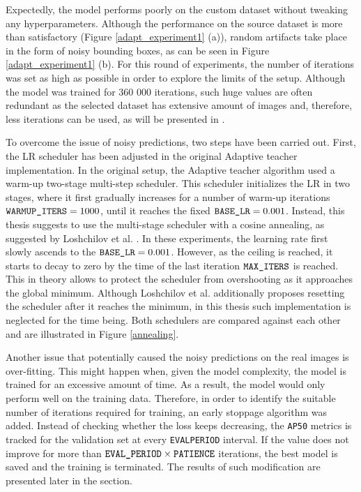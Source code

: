 Expectedly, the model performs poorly on the custom dataset without tweaking any hyperparameters. Although the performance on the source dataset is more than satisfactory (Figure \ref{adapt_experiment1} (a)), random artifacts take place in the form of noisy bounding boxes, as can be seen in Figure \ref{adapt_experiment1} (b). For this round of experiments, the number of iterations was set as high as possible in order to explore the limits of the setup. Although the model was trained for 360 000 iterations, such huge values are often redundant as the selected dataset has extensive amount of images and, therefore, less iterations can be used, as will be presented in . 

To overcome the issue of noisy predictions, two steps have been carried out. First, the LR scheduler has been adjusted in the original Adaptive teacher \cite{Li2021} implementation. In the original setup, the Adaptive teacher algorithm used a warm-up two-stage multi-step scheduler. This scheduler initializes the LR in two stages, where it first gradually increases for a number of warm-up iterations $\texttt{WARMUP\textunderscore ITERS} = 1000$, until it reaches the fixed $\texttt{BASE\textunderscore LR} = 0.001$.  Instead, this thesis suggests to use the multi-stage scheduler with a cosine annealing, as suggested by Loshchilov et al. \cite{Loshchilov2016}. In these experiments, the learning rate first slowly ascends to the $\texttt{BASE\textunderscore LR} = 0.001$. However, as the ceiling is reached, it starts to decay to zero by the time of the last iteration $\texttt{MAX\textunderscore ITERS}$ is reached. This in theory allows to protect the scheduler from overshooting as it approaches the global minimum. Although Loshchilov et al. additionally proposes resetting the scheduler after it reaches the minimum, in this thesis such implementation is neglected for the time being. Both schedulers are compared against each other and are illustrated in Figure \ref{annealing}.

Another issue that potentially caused the noisy predictions on the real images is over-fitting. This might happen when, given the model complexity, the model is trained for an excessive amount of time. As a result, the model would only perform well on the training data. 
Therefore, in order to identify the suitable number of iterations required for training, an early stoppage algorithm was added. Instead of checking whether the loss keeps decreasing, the \texttt{AP50} metrics is tracked for the validation set at every \texttt{EVAL\textunderscore PERIOD} interval. If the value does not improve for more than $\texttt{EVAL\textunderscore PERIOD} \times \texttt{PATIENCE}$ iterations, the best model is saved and the training is terminated. The results of such modification are presented later in the  section.  

